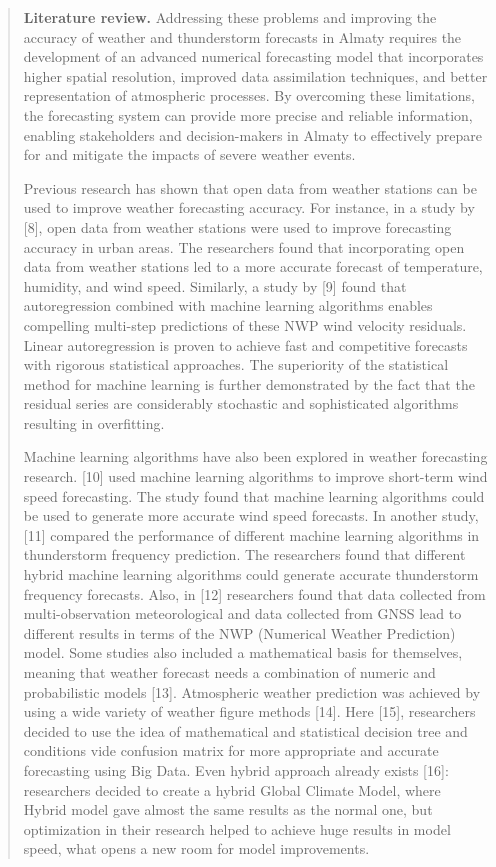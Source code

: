 \begin{quote}
\textbf{Literature review.} Addressing these problems and improving the
accuracy of weather and thunderstorm forecasts in Almaty requires the
development of an advanced numerical forecasting model that incorporates
higher spatial resolution, improved data assimilation techniques, and
better representation of atmospheric processes. By overcoming these
limitations, the forecasting system can provide more precise and
reliable information, enabling stakeholders and decision-makers in
Almaty to effectively prepare for and mitigate the impacts of severe
weather events.

Previous research has shown that open data from weather stations can be
used to improve weather forecasting accuracy. For instance, in a study
by {[}8{]}, open data from weather stations were used to improve
forecasting accuracy in urban areas. The researchers found that
incorporating open data from weather stations led to a more accurate
forecast of temperature, humidity, and wind speed. Similarly, a study by
{[}9{]} found that autoregression combined with machine learning
algorithms enables compelling multi-step predictions of these NWP wind
velocity residuals. Linear autoregression is proven to achieve fast and
competitive forecasts with rigorous statistical approaches. The
superiority of the statistical method for machine learning is further
demonstrated by the fact that the residual series are considerably
stochastic and sophisticated algorithms resulting in overfitting.

Machine learning algorithms have also been explored in weather
forecasting research. {[}10{]} used machine learning algorithms to
improve short-term wind speed forecasting. The study found that machine
learning algorithms could be used to generate more accurate wind speed
forecasts. In another study, {[}11{]} compared the performance of
different machine learning algorithms in thunderstorm frequency
prediction. The researchers found that different hybrid machine learning
algorithms could generate accurate thunderstorm frequency forecasts.
Also, in {[}12{]} researchers found that data collected from
multi-observation meteorological and data collected from GNSS lead to
different results in terms of the NWP (Numerical Weather Prediction)
model. Some studies also included a mathematical basis for themselves,
meaning that weather forecast needs a combination of numeric and
probabilistic models {[}13{]}. Atmospheric weather prediction was
achieved by using a wide variety of weather figure methods {[}14{]}.
Here {[}15{]}, researchers decided to use the idea of mathematical and
statistical decision tree and conditions vide confusion matrix for more
appropriate and accurate forecasting using Big Data. Even hybrid
approach already exists {[}16{]}: researchers decided to create a hybrid
Global Climate Model, where Hybrid model gave almost the same results as
the normal one, but optimization in their research helped to achieve
huge results in model speed, what opens a new room for model
improvements.


\end{quote}
